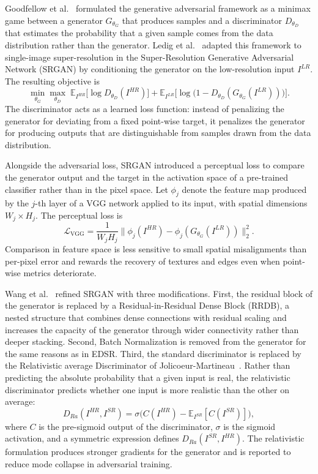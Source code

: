 Goodfellow et al.~\cite{goodfellow2014gan} formulated the generative adversarial framework as a minimax game between a generator $G_{\theta_G}$ that produces samples and a discriminator $D_{\theta_D}$ that estimates the probability that a given sample comes from the data distribution rather than the generator. Ledig et al.~\cite{cvf_srgan} adapted this framework to single-image super-resolution in the Super-Resolution Generative Adversarial Network (SRGAN) by conditioning the generator on the low-resolution input $I^{LR}$. The resulting objective is
\begin{equation}
    \min_{\theta_G} \max_{\theta_D} \;
    \mathbb{E}_{I^{HR}} \bigl[\log D_{\theta_D}(I^{HR})\bigr] +
    \mathbb{E}_{I^{LR}} \bigl[\log\bigl(1 - D_{\theta_D}(G_{\theta_G}(I^{LR}))\bigr)\bigr].
\end{equation}
The discriminator acts as a learned loss function: instead of penalizing the generator for deviating from a fixed point-wise target, it penalizes the generator for producing outputs that are distinguishable from samples drawn from the data distribution.

Alongside the adversarial loss, SRGAN introduced a perceptual loss to compare the generator output and the target in the activation space of a pre-trained classifier rather than in the pixel space. Let $\phi_j$ denote the feature map produced by the $j$-th layer of a VGG network applied to its input, with spatial dimensions $W_j \times H_j$. The perceptual loss is
\begin{equation}
    \mathcal{L}_{\text{VGG}} = \frac{1}{W_j H_j}
    \bigl\| \phi_j(I^{HR}) - \phi_j(G_{\theta_G}(I^{LR})) \bigr\|_2^2.
\end{equation}
Comparison in feature space is less sensitive to small spatial misalignments than per-pixel error and rewards the recovery of textures and edges even when point-wise metrics deteriorate.

Wang et al.~\cite{wang2018esrgan} refined SRGAN with three modifications. First, the residual block of the generator is replaced by a Residual-in-Residual Dense Block (RRDB), a nested structure that combines dense connections with residual scaling and increases the capacity of the generator through wider connectivity rather than deeper stacking. Second, Batch Normalization is removed from the generator for the same reasons as in EDSR. Third, the standard discriminator is replaced by the Relativistic average Discriminator of Jolicoeur-Martineau~\cite{jolicoeur2018relativistic}. Rather than predicting the absolute probability that a given input is real, the relativistic discriminator predicts whether one input is more realistic than the other on average:
\begin{equation}
    D_{Ra}(I^{HR}, I^{SR}) = \sigma\bigl(C(I^{HR}) - \mathbb{E}_{I^{SR}}[C(I^{SR})]\bigr),
\end{equation}
where $C$ is the pre-sigmoid output of the discriminator, $\sigma$ is the sigmoid activation, and a symmetric expression defines $D_{Ra}(I^{SR}, I^{HR})$. The relativistic formulation produces stronger gradients for the generator and is reported to reduce mode collapse in adversarial training.

